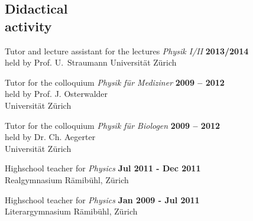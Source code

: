 \documentclass[a4paper,margin,line,useAMS,usenatbib]{resume}
\begin{document}
\begin{resume}
\section{\mysidestyle Didactical\\activity}

\begin{list2}

  \item Tutor and lecture assistant for the lectures \emph{Physik I/II}
        \hfill {\bf 2013/2014} \\
        held by Prof. U.~Straumann
        Universität Zürich

  \item Tutor for the colloquium \emph{Physik für Mediziner}
        \hfill {\bf 2009 -- 2012} \\
        held by Prof. J. Osterwalder\\
        Universität Zürich

  \item Tutor for the colloquium \emph{Physik für Biologen}
        \hfill {\bf 2009 -- 2012} \\
        held by Dr. Ch. Aegerter\\
        Universität Zürich

  \item Highschool teacher for \emph{Physics}
        \hfill {\bf Jul 2011 - Dec 2011}\\
        Realgymnasium Rämibühl, Zürich

  \item Highschool teacher for \emph{Physics}
        \hfill {\bf Jan 2009 - Jul 2011}\\
        Literargymnasium Rämibühl, Zürich

\end{list2}



\newpage


\end{resume}
\end{document}

